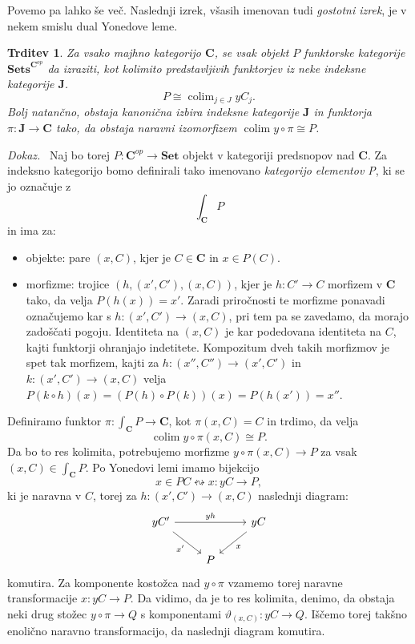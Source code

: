 \documentclass[12pt,a4paper]{book}
\theoremstyle{definition}
\theoremstyle{plain}
\newtheorem{trditev}[definicija]{Trditev}
\newenvironment{dokaz}{\emph{Dokaz.}\ }{\hspace{\fill}{$\Box$}}
\theoremstyle{definition}
\theoremstyle{remark}
\newcommand{\cat}[1]{\textbf{#1}}
\DeclareMathOperator{\colim}{colim}
\newcommand{\predsnop}[1]{\cat{Sets}^{\cat{#1}^{op}}}
\begin{document}
Povemo pa lahko še več. Naslednji izrek, všasih imenovan tudi \emph{gostotni izrek}, je v nekem smislu dual Yonedove leme.

\begin{trditev}
\label{density theorem}
Za vsako majhno kategorijo $\cat{C}$, se vsak objekt $P$ funktorske kategorije $\predsnop{C}$ da izraziti, kot kolimito predstavljivih funktorjev iz neke indeksne kategorije $\cat{J}$.
$$ P \cong \colim_{j \in J} yC_j.$$
Bolj natančno, obstaja kanonična izbira indeksne kategorije $\cat{J}$ in funktorja $\pi : \cat{J} \to \cat{C}$ tako, da obstaja naravni izomorfizem $\colim y \circ \pi \cong P$.
\end{trditev}
\begin{dokaz}
Naj bo torej $P : \cat{C}^{op} \to \cat{Set}$ objekt v kategoriji predsnopov nad $\cat{C}$. Za indeksno kategorijo bomo definirali tako imenovano \emph{kategorijo elementov P}, ki se jo označuje z
$$\int_{\cat{C}}P$$
in ima za:
\begin{itemize}
\item objekte: pare $(x,C)$, kjer je $C \in \cat{C}$ in $x \in P(C)$.
\item morfizme: trojice $(h, (x',C'), (x,C))$, kjer je $h : C' \to C$ morfizem v $\cat{C}$ tako, da velja $P(h(x)) = x'$. Zaradi priročnosti te morfizme ponavadi označujemo kar s $h : (x', C') \to (x,C)$, pri tem pa se zavedamo, da morajo zadoščati pogoju.
Identiteta na $(x,C)$ je kar podedovana identiteta na $C$, kajti funktorji ohranjajo indetitete. Kompozitum dveh takih morfizmov je spet tak morfizem, kajti za $h : (x'', C'') \to (x', C')$ in $k : (x', C') \to (x,C)$ velja $P(k \circ h)(x) = (P(h) \circ P(k))(x) = P(h(x')) = x''$.
\end{itemize}
Definiramo funktor $\pi : \int_{\cat{C}}P \to \cat{C}$, kot $\pi(x,C) = C$ in trdimo, da velja 
$$\colim y\circ \pi (x,C) \cong P.$$
Da bo to res kolimita, potrebujemo morfizme $y\circ \pi (x,C) \to P$ za vsak $(x,C) \in \int_{\cat{C}}P$. Po Yonedovi lemi imamo bijekcijo
$$x \in PC \leftrightsquigarrow x:yC \to P,$$
ki je naravna v $C$, torej za $h: (x',C') \to (x,C)$ naslednji diagram:
$$ \begin{tikzcd}
yC' \ar[rr, "yh"] \ar[rd, "x'"'] & & yC \ar[ld, "x"] \\
& P &
\end{tikzcd} $$
komutira. Za komponente kostožca nad $y \circ \pi$ vzamemo torej naravne transformacije $x : yC \to P$. Da vidimo, da je to res kolimita, denimo, da obstaja neki drug stožec $y \circ \pi \to Q$ s komponentami $\vartheta_{(x,C)} : yC \to Q$. Iščemo torej takšno enolično naravno transformacijo, da naslednji diagram komutira.

\end{dokaz}
\end{document}
